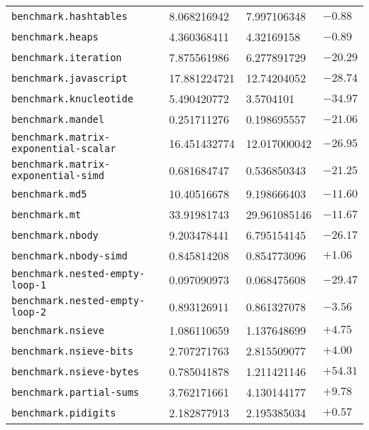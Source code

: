 \begin{longtable}{llll}
\texttt{benchmark.hashtables}               & 8.068216942       & 7.997106348         & $-0.88$     \\
\texttt{benchmark.heaps}                    & 4.360368411       & 4.32169158          & $-0.89$     \\
\texttt{benchmark.iteration}                & 7.875561986       & 6.277891729         & $-20.29$    \\
\texttt{benchmark.javascript}               & 17.881224721      & 12.74204052         & $-28.74$    \\
\texttt{benchmark.knucleotide}              & 5.490420772       & 3.5704101           & $-34.97$    \\
\texttt{benchmark.mandel}                   & 0.251711276       & 0.198695557         & $-21.06$    \\
\texttt{benchmark.matrix-exponential-scalar}& 16.451432774      & 12.017000042        & $-26.95$    \\
\texttt{benchmark.matrix-exponential-simd}  & 0.681684747       & 0.536850343         & $-21.25$    \\
\texttt{benchmark.md5}                      & 10.40516678       & 9.198666403         & $-11.60$    \\
\texttt{benchmark.mt}                       & 33.91981743       & 29.961085146        & $-11.67$    \\
\texttt{benchmark.nbody}                    & 9.203478441       & 6.795154145         & $-26.17$    \\
\texttt{benchmark.nbody-simd}               & 0.845814208       & 0.854773096         & $+1.06$     \\
\texttt{benchmark.nested-empty-loop-1}      & 0.097090973       & 0.068475608         & $-29.47$    \\
\texttt{benchmark.nested-empty-loop-2}      & 0.893126911       & 0.861327078         & $-3.56$     \\
\texttt{benchmark.nsieve}                   & 1.086110659       & 1.137648699         & $+4.75$     \\
\texttt{benchmark.nsieve-bits}              & 2.707271763       & 2.815509077         & $+4.00$     \\
\texttt{benchmark.nsieve-bytes}             & 0.785041878       & 1.211421146         & $+54.31$    \\
\texttt{benchmark.partial-sums}             & 3.762171661       & 4.130144177         & $+9.78$     \\
\texttt{benchmark.pidigits}                 & 2.182877913       & 2.195385034         & $+0.57$     \\

\end{longtable}
